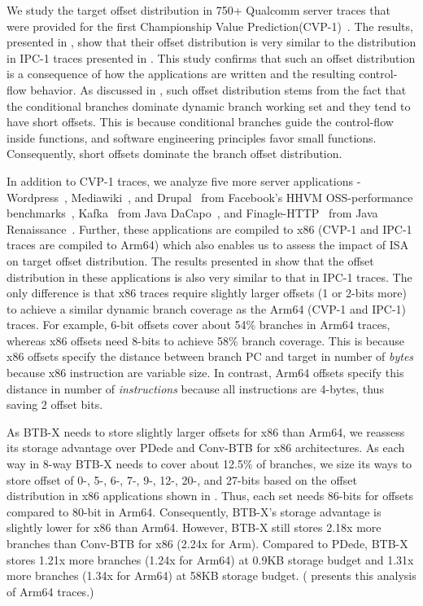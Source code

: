 We study the target offset distribution in 750+ Qualcomm server traces that were provided for the first Championship Value Prediction(CVP-1)~\cite{cvp}. The results, presented in , show that their offset distribution is very similar to the distribution in IPC-1 traces presented in . This study confirms that such an offset distribution is a consequence of how the applications are written and the resulting control-flow behavior. As discussed in , such offset distribution stems from the fact that the conditional branches dominate dynamic branch working set and they tend to have short offsets. This is because conditional branches guide the control-flow inside functions, and software engineering principles favor small functions. Consequently, short offsets dominate the branch offset distribution.

In addition to CVP-1 traces, we analyze five more server applications - Wordpress~\cite{wiki:wordpress}, Mediawiki~\cite{wiki:mediawiki}, and Drupal~\cite{wiki:drupal} from Facebook’s HHVM OSS-performance benchmarks~\cite{fboss}, Kafka~\cite{wiki:kafka} from Java DaCapo~\cite{blackburn2006dacapo}, and Finagle-HTTP~\cite{finagle-http} from Java Renaissance~\cite{Prokopec2019}. Further, these applications are compiled to x86 (CVP-1 and IPC-1 traces are compiled to Arm64) which also enables us to assess the impact of ISA on target offset distribution. The results presented in  show that the offset distribution in these applications is also very similar to that in IPC-1 traces. The only difference is that x86 traces require slightly larger offsets (1 or 2-bits more) to achieve a similar dynamic branch coverage as the Arm64 (CVP-1 and IPC-1) traces. For example, 6-bit offsets cover about 54\% branches in Arm64 traces, whereas x86 offsets need 8-bits to achieve 58\% branch coverage. This is because x86 offsets specify the distance between branch PC and target in number of \emph{bytes} because x86 instruction are variable size. In contrast, Arm64 offsets specify this distance in number of \emph{instructions} because all instructions are 4-bytes, thus saving 2 offset bits.

As BTB-X needs to store slightly larger offsets for x86 than Arm64, we reassess its storage advantage over PDede and Conv-BTB for x86 architectures. As each way in 8-way BTB-X needs to cover about 12.5\% of branches, we size its ways to store offset of 0-, 5-, 6-, 7-, 9-, 12-, 20-, and 27-bits based on the offset distribution in x86 applications shown in . Thus, each set needs 86-bits for offsets compared to 80-bit in Arm64. Consequently, BTB-X's storage advantage is slightly lower for x86 than Arm64. However, BTB-X still stores 2.18x more branches than Conv-BTB for x86 (2.24x for Arm). Compared to PDede, BTB-X stores 1.21x more branches (1.24x for Arm64) at 0.9KB storage budget and 1.31x more branches (1.34x for Arm64) at 58KB storage budget. ( presents this analysis of Arm64 traces.)

